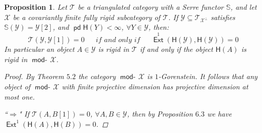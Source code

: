 \documentclass[oneside, a4paper,reqno]{amsart}
\numberwithin{equation}{section}
\newtheorem{prop}[thm]{Proposition}
\theoremstyle{definition}
\begin{document}
\begin{prop} Let ${\mathcal T}$ be a triangulated category with a Serre functor $\mathbb S$, and let ${\mathcal X}$  be a covariantly finite fully rigid subcategory  of ${\mathcal T}$.  If ${\mathcal Y} \subseteq {\mathcal T}_{{\mathcal X}^{\bot}}$  satisfies $\mathbb S({\mathcal Y}) = {\mathcal Y}[2]$, and $\operatorname{\mathsf{pd}}\mathsf{H}(Y) < \infty$, $\forall Y \in {\mathcal Y}$, then:
\[{\mathcal T}({\mathcal Y},{\mathcal Y}[1]) = 0 \ \ \ \ \ \ \ \textit{if and only if} \ \ \ \ \ \ \ \operatorname*{\mathsf{Ext}}^{1}(\mathsf{H}({\mathcal Y}),\mathsf{H}({\mathcal Y})) = 0\]
In particular an object $A \in {\mathcal Y}$ is rigid in ${\mathcal T}$ if and only if the object $\mathsf{H}(A)$ is rigid in $\operatorname*{\mathsf{mod}-\!}{\mathcal X}$.
\begin{proof} By Theorem $5.2$ the category $\operatorname*{\mathsf{mod}-\!}{\mathcal X}$ is $1$-Gorenstein. It follows that any object of $\operatorname*{\mathsf{mod}-\!}{\mathcal X}$ with finite projective dimension has projective dimension at most one. 
 

``$\Longrightarrow$" If ${\mathcal T}(A,B[1]) = 0$, $\forall A, B \in {\mathcal Y}$, then by Proposition $6.3$ we have $\operatorname*{\mathsf{Ext}}^{1}(\mathsf{H}(A),\mathsf{H}(B)) = 0$. 


\end{proof}
\end{prop}
\end{document}
